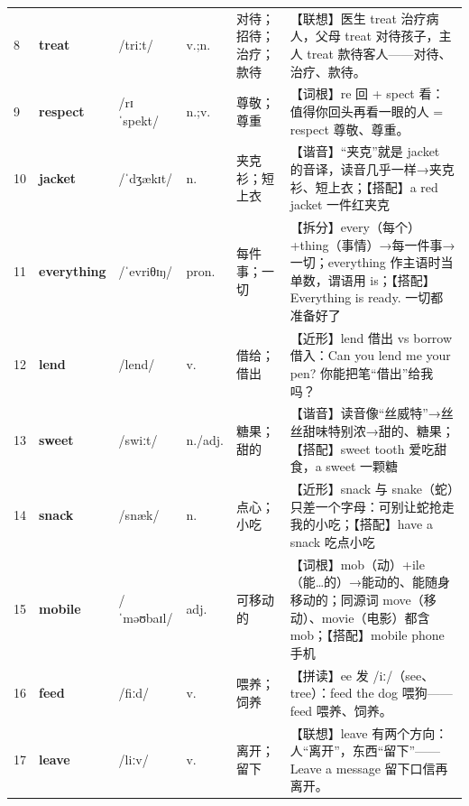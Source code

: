 \documentclass[UTF8,a4paper,11pt,oneside]{ctexbook}
\newcommand{\cellword}[1]{{\bfseries\textcolor{wordcol}{#1}}}
\newcommand{\cellipa}[1]{{\footnotesize\textcolor{ipacol}{#1}}}
\newcommand{\cellpos}[1]{\textcolor{poscol}{#1}}
\newcommand{\cellno}[1]{\textcolor{volcolor!75!black}{#1}}
\begin{document}
{\begin{longtable}{@{}C{0.045\textwidth}L{0.155\textwidth}L{0.175\textwidth}C{0.070\textwidth}L{0.180\textwidth}L{0.282\textwidth}@{}}
\cellno{8} & \cellword{treat} & \cellipa{/triːt/} & \cellpos{v.;\allowbreak{}n.} & 对待；招待；治疗；款待 & \textcolor{tagAssoc}{【联想】}医生 treat 治疗病人，父母 treat 对待孩子，主人 treat 款待客人——对待、治疗、款待。 \\
 \cellno{9} & \cellword{respect} & \cellipa{/rɪˈspekt/} & \cellpos{n.;\allowbreak{}v.} & 尊敬；尊重 & \textcolor{tagRoot}{【词根】}re 回 + spect 看：值得你回头再看一眼的人 = respect 尊敬、尊重。 \\
\cellno{10} & \cellword{jacket} & \cellipa{/ˈdʒækɪt/} & \cellpos{n.} & 夹克衫；短上衣 & \textcolor{tagSound}{【谐音】}“夹克”就是 jacket 的音译，读音几乎一样→\allowbreak{}夹克衫、短上衣；\textcolor{tagColloc}{【搭配】}a red jacket 一件红夹克 \\
 \cellno{11} & \cellword{everything} & \cellipa{/ˈevriθɪŋ/} & \cellpos{pron.} & 每件事；一切 & \textcolor{tagSplit}{【拆分】}every（每个）+thing（事情）→\allowbreak{}每一件事→\allowbreak{}一切；everything 作主语时当单数，谓语用 is；\textcolor{tagColloc}{【搭配】}Everything is ready. 一切都准备好了 \\
\cellno{12} & \cellword{lend} & \cellipa{/lend/} & \cellpos{v.} & 借给；借出 & \textcolor{tagNear}{【近形】}lend 借出 vs borrow 借入：Can you lend me your pen? 你能把笔“借出”给我吗？ \\
 \cellno{13} & \cellword{sweet} & \cellipa{/swiːt/} & \cellpos{n./\allowbreak{}adj.} & 糖果；甜的 & \textcolor{tagSound}{【谐音】}读音像“丝威特”→\allowbreak{}丝丝甜味特别浓→\allowbreak{}甜的、糖果；\textcolor{tagColloc}{【搭配】}sweet tooth 爱吃甜食，a sweet 一颗糖 \\
\cellno{14} & \cellword{snack} & \cellipa{/snæk/} & \cellpos{n.} & 点心；小吃 & \textcolor{tagNear}{【近形】}snack 与 snake（蛇）只差一个字母：可别让蛇抢走我的小吃；\textcolor{tagColloc}{【搭配】}have a snack 吃点小吃 \\
 \cellno{15} & \cellword{mobile} & \cellipa{/ˈməʊbaɪl/} & \cellpos{adj.} & 可移动的 & \textcolor{tagRoot}{【词根】}mob（动）+ile（能…的）→\allowbreak{}能动的、能随身移动的；同源词 move（移动）、movie（电影）都含 mob；\textcolor{tagColloc}{【搭配】}mobile phone 手机 \\
\cellno{16} & \cellword{feed} & \cellipa{/fiːd/} & \cellpos{v.} & 喂养；饲养 & \textcolor{tagSpell}{【拼读】}ee 发 /iː/（see、tree）：feed the dog 喂狗——feed 喂养、饲养。 \\
 \cellno{17} & \cellword{leave} & \cellipa{/liːv/} & \cellpos{v.} & 离开；留下 & \textcolor{tagAssoc}{【联想】}leave 有两个方向：人“离开”，东西“留下”——Leave a message 留下口信再离开。 \\

\end{longtable}}
\end{document}
